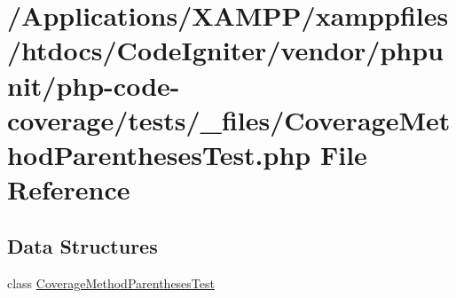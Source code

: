 \hypertarget{php-code-coverage_2tests_2__files_2_coverage_method_parentheses_test_8php}{}\section{/\+Applications/\+X\+A\+M\+P\+P/xamppfiles/htdocs/\+Code\+Igniter/vendor/phpunit/php-\/code-\/coverage/tests/\+\_\+files/\+Coverage\+Method\+Parentheses\+Test.php File Reference}
\label{php-code-coverage_2tests_2__files_2_coverage_method_parentheses_test_8php}
\subsection*{Data Structures}
\begin{DoxyCompactItemize}
\item 
class \mbox{\hyperlink{class_coverage_method_parentheses_test}{Coverage\+Method\+Parentheses\+Test}}
\end{DoxyCompactItemize}
